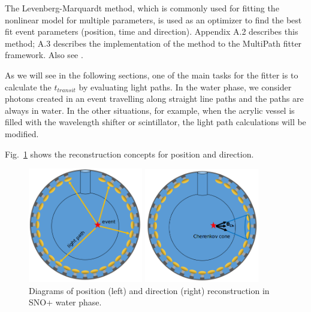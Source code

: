 The Levenberg-Marquardt method, which is commonly used for fitting the nonlinear model for multiple parameters, is used as an optimizer to find the best fit event parameters (position, time and direction). Appendix A.2 describes this method; A.3 describes the implementation of the method to the MultiPath fitter framework. Also see \cite{gregory2005bayesian, press2007numerical}.

As we will see in the following sections, one of the main tasks for the fitter is to calculate the $t_{transit}$ by evaluating light paths. In the water phase, we consider photons created in an event travelling along straight line paths and the paths are always in water. In the other situations, for example, when the acrylic vessel is filled with the wavelength shifter or scintillator, the light path calculations will be modified.   

Fig.~\ref{mpwdiagram} shows the reconstruction concepts for position and direction.
\begin{figure}[htbp]
	\centering
	\begin{minipage}[t]{0.45\textwidth}
		\centering
		\includegraphics[width=5cm]{mpwDiagram.png}
	\end{minipage}
	\begin{minipage}[t]{0.4\textwidth}
		\centering
		\includegraphics[width=5cm]{mpwDiagram2.png}
	\end{minipage}
	\caption{Diagrams of position (left) and direction (right) reconstruction in SNO+ water phase.}
	\label{mpwdiagram}
\end{figure}
	
